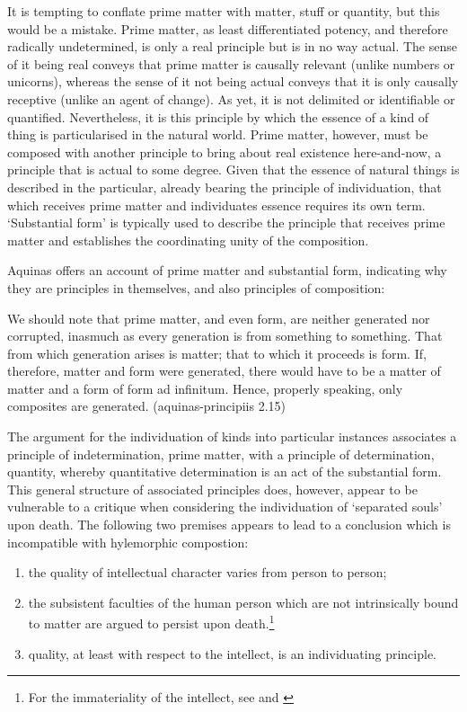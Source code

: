 It is tempting to conflate prime matter with matter, stuff or quantity, but this would be a mistake. Prime matter, as least differentiated potency, and therefore radically undetermined, is only a real principle but is in no way actual. The sense of it being real conveys that prime matter is causally relevant (unlike numbers or unicorns), whereas the sense of it not being actual conveys that it is only causally receptive (unlike an agent of change).
As yet, it is not delimited or identifiable or quantified. Nevertheless, it is this principle by which the essence of a kind of thing is particularised in the natural world. Prime matter, however, must be composed with another principle to bring about real existence here-and-now, a principle that is actual to some degree. Given that the essence of natural things is described in the particular, already bearing the principle of individuation, that which receives prime matter and individuates essence requires its own term. `Substantial form' is typically used to describe the principle that receives prime matter and establishes the coordinating unity of the composition.

Aquinas offers an account of prime matter and substantial form, indicating why they are principles in themselves, and also principles of composition:
\begin{quoting}
We should note that prime matter, and even form, are neither generated nor corrupted, inasmuch as every generation is from something to something. That from which generation arises is matter; that to which it proceeds is form. If, therefore, matter and form were generated, there would have to be a matter of matter and a form of form ad infinitum. Hence, properly speaking, only composites are generated. (\acrshort{aquinas-principiis} 2.15)
\end{quoting}

The argument for the individuation of kinds into particular instances associates a principle of indetermination, prime matter, with a principle of determination, quantity, whereby quantitative determination is an act of the substantial form. This general structure of associated principles does, however, appear to be vulnerable to a critique when considering the individuation of `separated souls' upon death.
The following two premises appears to lead to a conclusion which is incompatible with hylemorphic compostion:
\begin{enumerate}
\item the quality of intellectual character varies from person to person;
\item the subsistent faculties of the human person which are not intrinsically bound to matter are argued to persist upon death.\footnote{For the immateriality of the intellect, see \cite[][219--28]{feser2006philosophy} and \cite[][]{Oderberg2005-ODEHD}}
\item quality, at least with respect to the intellect, is an individuating principle.
\end{enumerate}

